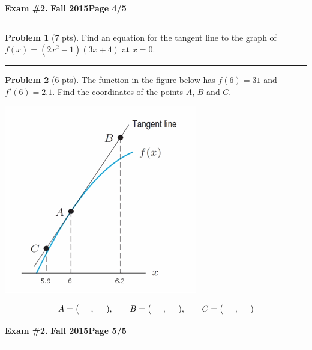 \documentclass[12pt]{article}
\theoremstyle{definition}
\newtheorem{problem}{Problem}
\begin{document}
\newpage

\hfill{\large\bf Exam \#2.}\hfill{\large\bf
  Fall 2015}\hfill{\large\bf Page 4/5}\hrule

\bigskip
\begin{problem}[7 pts]
Find an equation for the tangent line to the graph of $f(x) = (2x^2-1)(3x+4)$ at $x=0$.

\vspace{5cm} 

\begin{flushright}
\end{flushright}
\end{problem}
\hrule

\begin{problem}[6 pts]
The function in the figure below has $f(6)=31$ and $f'(6)=2.1$. Find the coordinates of the points $A$, $B$ and $C$.
\begin{center}
\includegraphics[width=0.5\linewidth]{graph.png}
\end{center}
\begin{equation*}
A = \big( \hspace{0.5cm}, \hspace{0.5cm} ), \qquad B = \big( \hspace{0.5cm}, \hspace{0.5cm} ), \qquad C = \big( \hspace{0.5cm}, \hspace{0.5cm})
\end{equation*}
\end{problem}

\newpage

\hfill{\large\bf Exam \#2.}\hfill{\large\bf
  Fall 2015}\hfill{\large\bf Page 5/5}\hrule
\end{document}

